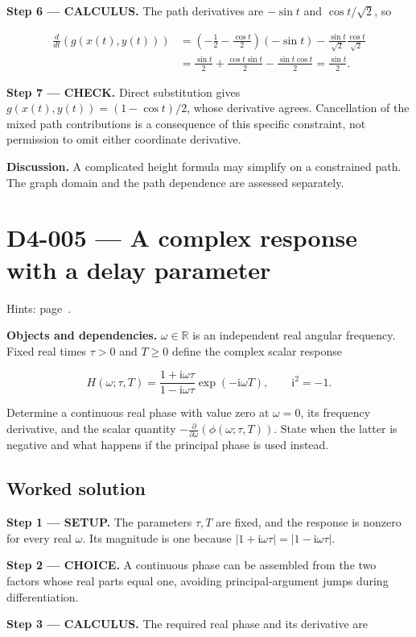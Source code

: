 \documentclass[11pt,oneside,openany]{book}
\begin{document}
\endgroup
\textbf{Step 6 --- CALCULUS.} The path derivatives are \(-\sin t\) and \(\cos t/\sqrt2\), so

\[
\begin{aligned}
\frac{d}{dt}\left(g(x(t),y(t))\right)
&=\left(-\frac12-\frac{\cos t}{2}\right)(-\sin t)
-\frac{\sin t}{\sqrt2}\frac{\cos t}{\sqrt2}\\
&=\frac{\sin t}{2}+\frac{\cos t\sin t}{2}-\frac{\sin t\cos t}{2}
=\frac{\sin t}{2}.
\end{aligned}
\]

\textbf{Step 7 --- CHECK.} Direct substitution gives \(g(x(t),y(t))=(1-\cos t)/2\), whose derivative agrees. Cancellation of the mixed path contributions is a consequence of this specific constraint, not permission to omit either coordinate derivative.

\textbf{Discussion.} A complicated height formula may simplify on a constrained path. The graph domain and the path dependence are assessed separately.
\clearpage
\section{D4-005 --- A complex response with a delay parameter}
\label{problem:D4-005}
{\small Hints: page~\pageref{hints:D4-005}.}\par\medskip

\textbf{Objects and dependencies.} \(\omega\in\mathbb R\) is an independent real angular frequency. Fixed real times \(\tau>0\) and \(T\ge0\) define the complex scalar response

\[
H(\omega;\tau,T)=\frac{1+\mathrm{i}\omega\tau}{1-\mathrm{i}\omega\tau}\exp(-\mathrm{i}\omega T),\qquad \mathrm{i}^2=-1.
\]

Determine a continuous real phase with value zero at \(\omega=0\), its frequency derivative, and the scalar quantity \(-\frac{\partial}{\partial\omega}(\phi(\omega;\tau,T))\). State when the latter is negative and what happens if the principal phase is used instead.
\subsection*{Worked solution}

\textbf{Step 1 --- SETUP.} The parameters \(\tau,T\) are fixed, and the response is nonzero for every real \(\omega\). Its magnitude is one because \(|1+\mathrm{i}\omega\tau|=|1-\mathrm{i}\omega\tau|\).

\begin{ChoiceStep}
\textbf{Step 2 --- CHOICE.} A continuous phase can be assembled from the two factors whose real parts equal one, avoiding principal-argument jumps during differentiation.

\end{ChoiceStep}
\textbf{Step 3 --- CALCULUS.} The required real phase and its derivative are
\end{document}
